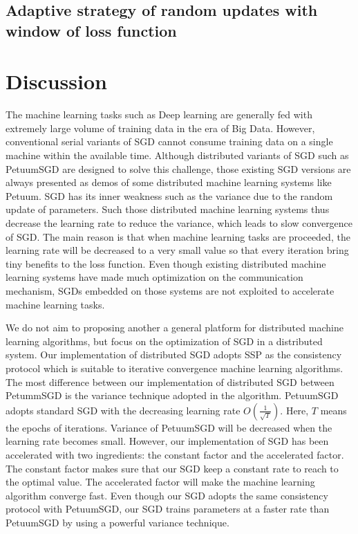 \documentclass[10pt,journal,finalsubmission,compsoc]{IEEEtran}
\begin{document}
\subsection{Adaptive strategy of random updates with window of loss function}














\section{Discussion}
\label{discussion}
The machine learning tasks such as Deep learning are generally fed with extremely large volume of training data in the era of Big Data. However, conventional serial variants of SGD  cannot consume training data on a single machine within the available time. Although distributed variants of SGD such as PetuumSGD are designed to solve this challenge, those existing SGD versions are always presented as demos of some distributed machine learning systems like Petuum. SGD has its inner weakness such as the variance due to the random update of parameters. Such those distributed machine learning systems thus decrease the learning rate to reduce the variance, which leads to slow convergence of SGD. The main reason is that when machine learning tasks are proceeded, the learning rate will be decreased to a very small value so that every iteration bring tiny benefits to the loss function. Even though existing distributed machine learning systems have made much optimization on the communication mechanism, SGDs embedded on those systems are not exploited to accelerate machine learning tasks. 

We do not aim to proposing another a general platform for distributed machine learning algorithms, but focus on the optimization of SGD in a distributed system. Our implementation of distributed SGD adopts SSP as the consistency protocol which is suitable to iterative convergence machine learning algorithms. The most difference between our implementation of distributed SGD between PetummSGD is the variance technique adopted in the algorithm. PetuumSGD adopts standard SGD with the decreasing learning rate $O(\frac{1}{\sqrt{T}})$. Here, $T$ means the epochs of iterations. Variance of PetuumSGD will be decreased when the learning rate becomes small. However, our implementation of SGD has been accelerated with two ingredients: the constant factor and the accelerated factor. The constant factor makes sure that our SGD keep a constant rate to reach to the optimal value. The accelerated factor will make the machine learning algorithm converge fast. Even though our SGD adopts the same consistency protocol with PetuumSGD, our SGD trains parameters at a faster rate than PetuumSGD by using a powerful variance technique. 
\end{document}
